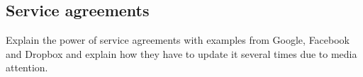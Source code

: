\subsection{Service agreements}
Explain the power of service agreements with examples from Google, Facebook and Dropbox and explain how they have to update it several times due to media attention.
